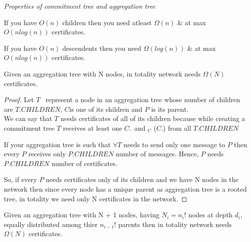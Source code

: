 \textit{Properties of commitment tree and aggregation tree}

	If you have $O(n)$ children then you need atleast $\Omega(n)$ \& at max $O(nlog(n))$ certificates.

	If you have $O(n)$ descendents then you need $\Omega(log(n))$  \& at max $O(nlog(n))$ certificates.


\begin{theorem} \label{min certificates}
	Given an aggregation tree with N nodes, in totality network needs $\Omega(N)$ certificates.
\end{theorem}

\begin{proof}
	
	Let $T$ \ represent a node in an aggregation tree whose number of children are $T$.$CHILDREN$, $C$is one of its children and $P$ is its parent.\\
	We can say that $T$ needs certificates of all of its children because while creating a commitment tree $T$ receives at least one $C$.\msg \ and \sign$_{C}$ ($C$.\msg)  from all $T$.$CHILDREN$

	If your aggregation tree is such that $\forall T$ needs to send only one message to $P$ then every $P$ receives only $P.CHILDREN$ number of messages. Hence, $P$ needs $P.CHILDREN$ number of certificates.

	So, if every $P$ needs certificates only of its children  and we have N nodes in the network then since every node has a unique parent as aggregation tree is a rooted tree, in totality we need only N certificates in the network.

\end{proof}


\begin{theorem}
		Given an aggregation tree with N + 1 nodes, having $N_{i} = n_{i}!$ nodes at depth $d_{i}$, equally distributed among thier $n_{i-1}!$ parents then in totality network needs $\Omega(N)$ certificates.
\end{theorem}

